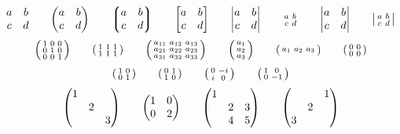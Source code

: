 \documentclass{article}
\begin{document}
\[
 \mqty{a & b \\ c & d}
\qquad {\mqty(a & b \\ c & d)}
\qquad {\mqty*(a & b \\ c & d)}
\qquad {\mqty[a & b \\ c & d]}
\qquad {\mqty|a & b \\ c & d|}
\qquad \smqty{a & b \\ c & d} 
\qquad {\mdet{a & b \\ c & d}}
\qquad {\smdet{a & b \\ c & d}}
\]
\[
 \smqty(\imat{3})
\qquad \smqty(\xmat{1}{2}{3})
\qquad \smqty(\xmat*{a}{3}{3})
\qquad \smqty(\xmat*{a}{3}{1})
\qquad \smqty(\xmat*{a}{1}{3})
\qquad \smqty(\zmat{2}{2})
\]
\[
 \smqty(\pmat{0})
\qquad \smqty(\pmat{1})
\qquad \smqty(\pmat{2})
\qquad \smqty(\pmat{3})
\]
\[
 \mqty(\dmat{1,2,3})
\qquad \mqty(\dmat[0]{1,2})
\qquad \mqty(\dmat{1,2&3\\4&5})
\qquad \mqty(\admat{1,2,3})
\]
\end{document}
